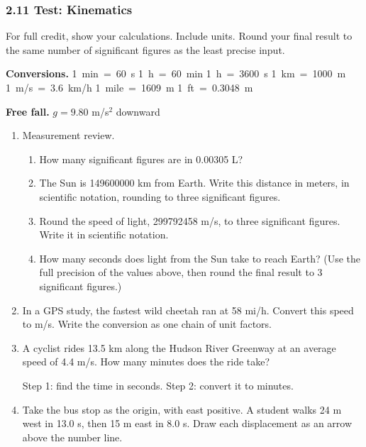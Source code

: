 \documentclass[12pt, twoside]{article}
\newcommand{\testfront}{%
\subsubsection*{2.11 Test: Kinematics}

For full credit, show your calculations. Include units. Round your final result to
the same number of significant figures as the least precise input.

\textbf{Conversions.} \quad
\mbox{1 min = 60 s} \quad \mbox{1 h = 60 min} \quad \mbox{1 h = 3600 s} \quad
\mbox{1 km = 1000 m} \\
\hspace*{2.65cm}\mbox{1 m/s = 3.6 km/h} \quad \mbox{1 mile = 1609 m} \quad
\mbox{1 ft = 0.3048 m}

\textbf{Free fall.} \quad $g = 9.80$ m/s$^2$ downward

\vspace{0.2cm}}
\begin{document}
\testfront

\begin{enumerate}[itemsep=0.6cm]

\item Measurement review.
  \begin{enumerate}[itemsep=0.6cm]
    \item How many significant figures are in \num{0.00305} L?
      \vspace{0.8cm}
    \item The Sun is \num{149600000} km from Earth. Write this distance in meters,
      in scientific notation, rounding to three significant figures.
      \vspace{1.0cm}
    \item Round the speed of light, \num{299792458} m/s, to three significant
      figures. Write it in scientific notation.
      \vspace{1.0cm}
    \item How many seconds does light from the Sun take to reach Earth? (Use the
      full precision of the values above, then round the final result to 3
      significant figures.)
      \vspace{3.2cm}
  \end{enumerate}

\item In a GPS study, the fastest wild cheetah ran at 58 mi/h. Convert this speed
  to m/s. Write the conversion as one chain of unit factors.

\newpage

\item A cyclist rides 13.5 km along the Hudson River Greenway at an average speed of
  4.4 m/s. How many minutes does the ride take?

  Step 1: find the time in seconds. \quad Step 2: convert it to minutes.
  \vspace{7.0cm}

\item Take the bus stop as the origin, with east positive. A student walks 24 m
  west in 13.0 s, then 15 m east in 8.0 s. Draw each displacement as an arrow
  above the number line.

  \begin{center}
  \end{center}


\end{enumerate}
\end{document}
